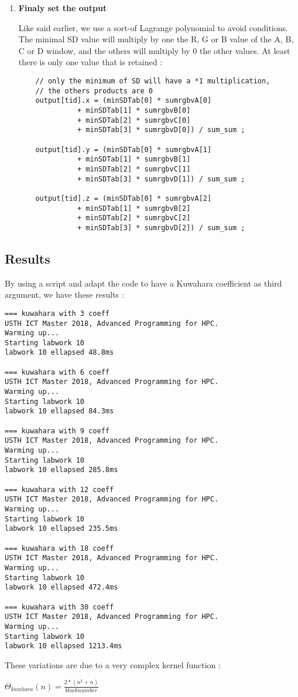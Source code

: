 \documentclass{article}
\begin{document}
\begin{enumerate}
    \item \textbf{Finaly set the output}
    
    Like said earlier, we use a sort-of Lagrange polynomial to avoid conditions. The minimal SD value will multiply by one the R, G or B value of the A, B, C or D window, and the others will multiply by 0 the other values. At least there is only one value that is retained : 
    
    \begin{verbatim}
    // only the minimum of SD will have a *1 multiplication, 
    // the others products are 0
	output[tid].x = (minSDTab[0] * sumrgbvA[0]
			  + minSDTab[1] * sumrgbvB[0] 
			  + minSDTab[2] * sumrgbvC[0] 
			  + minSDTab[3] * sumrgbvD[0]) / sum_sum ; 
				  
	output[tid].y = (minSDTab[0] * sumrgbvA[1]
			  + minSDTab[1] * sumrgbvB[1] 
			  + minSDTab[2] * sumrgbvC[1] 
			  + minSDTab[3] * sumrgbvD[1]) / sum_sum ; 
			  
	output[tid].z = (minSDTab[0] * sumrgbvA[2]
			  + minSDTab[1] * sumrgbvB[2] 
			  + minSDTab[2] * sumrgbvC[2] 
			  + minSDTab[3] * sumrgbvD[2]) / sum_sum ; 
    \end{verbatim}
    
    
    \end{enumerate}

\subsection{Results}

    By using a script and adapt the code to have a Kuwahara coefficient as third argument, we have these results : 
   
    \begin{verbatim}
=== kuwahara with 3 coeff
USTH ICT Master 2018, Advanced Programming for HPC.
Warming up...
Starting labwork 10
labwork 10 ellapsed 48.8ms

=== kuwahara with 6 coeff
USTH ICT Master 2018, Advanced Programming for HPC.
Warming up...
Starting labwork 10
labwork 10 ellapsed 84.3ms

=== kuwahara with 9 coeff
USTH ICT Master 2018, Advanced Programming for HPC.
Warming up...
Starting labwork 10
labwork 10 ellapsed 285.8ms

=== kuwahara with 12 coeff
USTH ICT Master 2018, Advanced Programming for HPC.
Warming up...
Starting labwork 10
labwork 10 ellapsed 235.5ms

=== kuwahara with 18 coeff
USTH ICT Master 2018, Advanced Programming for HPC.
Warming up...
Starting labwork 10
labwork 10 ellapsed 472.4ms

=== kuwahara with 30 coeff
USTH ICT Master 2018, Advanced Programming for HPC.
Warming up...
Starting labwork 10
labwork 10 ellapsed 1213.4ms

    \end{verbatim}

    These variations are due to a very complex kernel function : 
    
    $\Theta_{kwahara}(n) = \frac{2 * (n^{2} + n)}{block number}$
    
    
\end{document}
